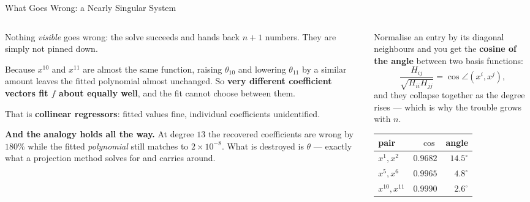 \begin{frame}{What Goes Wrong: a Nearly Singular System}
\begin{columns}[T]
\begin{column}{0.52\textwidth}
\small
Nothing \emph{visible} goes wrong: the solve succeeds and hands back $n+1$ numbers. They are simply
not pinned down.
\medskip

Because $x^{10}$ and $x^{11}$ are almost the same function, raising $\theta_{10}$ and lowering
$\theta_{11}$ by a similar amount leaves the fitted polynomial almost unchanged. So \textbf{very
different coefficient vectors fit $f$ about equally well}, and the fit cannot choose between them.
\medskip

That is \textbf{collinear regressors}: fitted values fine, individual coefficients unidentified.
\medskip

\textbf{And the analogy holds all the way.} At degree $13$ the recovered coefficients are wrong by
$180\%$ while the fitted \emph{polynomial} still matches to $2\times10^{-8}$. What is destroyed is
$\theta$ --- exactly what a projection method solves for and carries around.
\end{column}
\begin{column}{0.45\textwidth}
\begin{conceptbox}[title=\textbf{$H$ is a table of angles}]\footnotesize
Normalise an entry by its diagonal neighbours and you get the \textbf{cosine of the angle} between
two basis functions:
\[
  \frac{H_{ij}}{\sqrt{H_{ii}H_{jj}}}=\cos\angle(x^{i},x^{j}),
\]
and they collapse together as the degree rises --- which is why the trouble grows with $n$.
\end{conceptbox}
\medskip
\begin{center}\footnotesize
\begin{tabularx}{\linewidth}{@{}>{\raggedright\arraybackslash}X r r@{}}
\toprule
pair & $\cos$ & angle \\
\midrule
$x^{1},x^{2}$ & $0.9682$ & $14.5^{\circ}$ \\
$x^{5},x^{6}$ & $0.9965$ & $4.8^{\circ}$ \\
$x^{10},x^{11}$ & $0.9990$ & $\mathbf{2.6^{\circ}}$ \\
\bottomrule
\end{tabularx}
\end{center}
\end{column}
\end{columns}
\vspace{1mm}
\end{frame}


